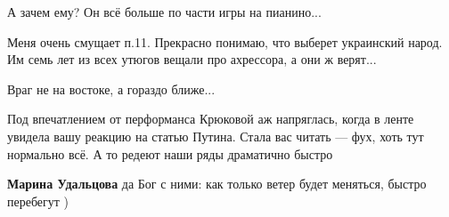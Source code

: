 \begin{itemize}
\begin{itemize}
 
А зачем ему? Он всё больше по части игры на пианино...
\end{itemize}

 

Меня очень смущает п.11. Прекрасно понимаю, что выберет украинский народ. Им
семь лет из всех утюгов вещали про ахрессора, а они ж верят...


 

Враг не на востоке, а гораздо ближе...


 

Под впечатлением от перформанса Крюковой аж напряглась, когда в ленте увидела
вашу реакцию на статью Путина. Стала вас читать — фух, хоть тут нормально всё.
А то редеют наши ряды драматично быстро

\begin{itemize}
 
\textbf{Марина Удальцова} да Бог с ними: как только ветер будет меняться, быстро перебегут )

 

\end{itemize}
\end{itemize}
